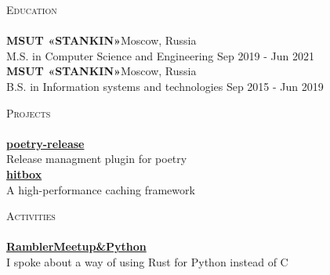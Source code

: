 \documentclass[a4paper]{article}
\newcommand{\lineunder} {
    \vspace*{-8pt} \\
    \hspace*{-18pt} \hrulefill \\
}
\newcommand{\header} [1] {
    {\hspace*{-18pt}\vspace*{6pt} \textsc{#1}}
    \vspace*{-6pt} \lineunder
}
\begin{document}
\newpage

\header{Education}
\textbf{MSUT «STANKIN»}\hfill Moscow, Russia\\
M.S. in Computer Science and Engineering \hfill Sep 2019 - Jun 2021\\
\vspace{2mm}
\textbf{MSUT «STANKIN»}\hfill Moscow, Russia\\
B.S. in Information systems and technologies \hfill Sep 2015 - Jun 2019\\
\vspace{2mm}

\header{Projects}
{\textbf{\href{https://github.com/topenkoff/poetry-release}{poetry-release}}}\\
Release managment plugin for poetry\\

\vspace*{2mm}
{\textbf{\href{https://github.com/hit-box/hitbox}{hitbox}}}\\
A high-performance caching framework\\
\vspace*{2mm}



\header{Activities}
{\textbf{\href{https://www.youtube.com/watch?v=gpf_KOAmgzY&t=3040s}{RamblerMeetup\&Python}}}\\
I spoke about a way of using Rust for Python instead of C\\
\vspace*{2mm}
\end{document}
